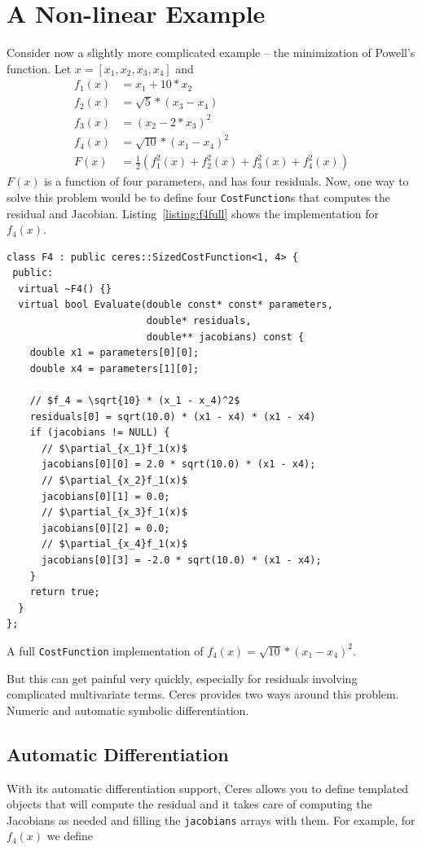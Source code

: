 \section{A Non-linear Example}
\label{sec:tutorial:powell}
Consider now a slightly more complicated example -- the minimization of Powell's function. Let $x = \left[x_1, x_2, x_3, x_4 \right]$ and
\begin{align}
   f_1(x) &= x_1 + 10*x_2 \\
   f_2(x) &= \sqrt{5} * (x_3 - x_4)\\
   f_3(x) &= (x_2 - 2*x_3)^2\\
   f_4(x) &= \sqrt{10} * (x_1 - x_4)^2\\
	F(x) & = \frac{1}{2}\left(f_1^2(x) + f_2^2(x) + f_3^2(x) + f_4^2(x) \right)
\end{align}
$F(x)$ is a function of four parameters, and has four residuals. Now,
one way to solve this problem would be to define four
\texttt{CostFunction}s that computes the residual and Jacobian. \eg Listing~\ref{listing:f4full} shows the implementation for $f_4(x)$.

\begin{listing}[H]
\begin{verbatim}
class F4 : public ceres::SizedCostFunction<1, 4> {
 public:
  virtual ~F4() {}
  virtual bool Evaluate(double const* const* parameters,
                        double* residuals,
                        double** jacobians) const {
    double x1 = parameters[0][0];
    double x4 = parameters[1][0];

    // $f_4 = \sqrt{10} * (x_1 - x_4)^2$
    residuals[0] = sqrt(10.0) * (x1 - x4) * (x1 - x4)
    if (jacobians != NULL) {
      // $\partial_{x_1}f_1(x)$
      jacobians[0][0] = 2.0 * sqrt(10.0) * (x1 - x4);
      // $\partial_{x_2}f_1(x)$
      jacobians[0][1] = 0.0;
      // $\partial_{x_3}f_1(x)$
      jacobians[0][2] = 0.0;
      // $\partial_{x_4}f_1(x)$
      jacobians[0][3] = -2.0 * sqrt(10.0) * (x1 - x4);
    }
    return true;
  }
};
\end{verbatim}
\caption{A full \texttt{CostFunction} implementation of $f_4(x) = \sqrt{10} * (x_1 - x_4)^2$.}
\label{listing:f4full}
\end{listing}

But this can get painful very quickly, especially for residuals involving complicated multivariate terms. Ceres provides two ways around this problem. Numeric and automatic symbolic differentiation.

\subsection{Automatic Differentiation}
\label{sec:tutorial:autodiff}
With its automatic differentiation support, Ceres allows you to define templated objects that will compute the residual and it takes care of computing the Jacobians as needed and filling the \texttt{jacobians} arrays with them.
For example, for $f_4(x)$ we define

